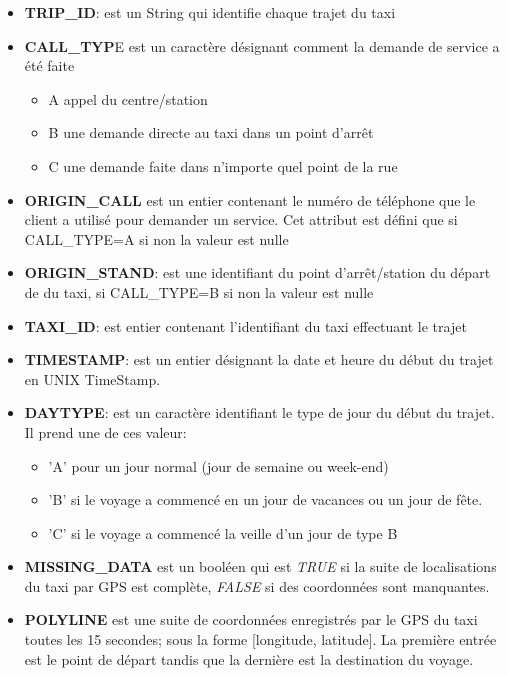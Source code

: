 \documentclass[]{report}
\begin{document}
	\begin{itemize}
		\item \textbf{TRIP\_ID}: est un String qui identifie chaque trajet du taxi
		\item \textbf{CALL\_TYP}E est un caractère désignant comment la demande de service a été faite
		\begin{itemize}
			\item A appel du centre/station
			\item B une demande directe au taxi dans un point d'arrêt
			\item C une demande faite dans n'importe quel point de la rue
		\end{itemize}
		\item \textbf{ORIGIN\_CALL} est un entier contenant le numéro de téléphone que le client a utilisé pour demander un service. Cet attribut est défini que si CALL\_TYPE=A si non la valeur est nulle
		\item \textbf{ORIGIN\_STAND}: est une identifiant du point d'arrêt/station du départ de du taxi, si CALL\_TYPE=B si non la valeur est nulle
		\item \textbf{TAXI\_ID}: est entier contenant  l'identifiant du taxi effectuant le trajet
		\item \textbf{TIMESTAMP}: est un entier désignant la date et heure du début du trajet en UNIX TimeStamp.
		\item \textbf{DAYTYPE}: est un caractère identifiant le type de jour du début du trajet. Il prend une de ces valeur:
		\begin{itemize}
			\item 'A' pour un jour normal (jour de semaine ou week-end)
			\item 'B' si le voyage a commencé en un jour de  vacances ou un jour de fête.
			\item 'C' si le voyage a commencé la veille d'un jour de type B
		\end{itemize}
		\item \textbf{MISSING\_DATA} est un booléen qui est \textit{TRUE} si la suite de localisations du taxi par  GPS est complète, \textit{FALSE} si des coordonnées sont manquantes.
		\item \textbf{POLYLINE} est une suite de coordonnées enregistrés par le GPS du taxi  toutes les 15 secondes; sous la forme [longitude, latitude]. La première entrée est le point de départ tandis que la dernière est la destination du voyage.
	\end{itemize}
	
\end{document}
